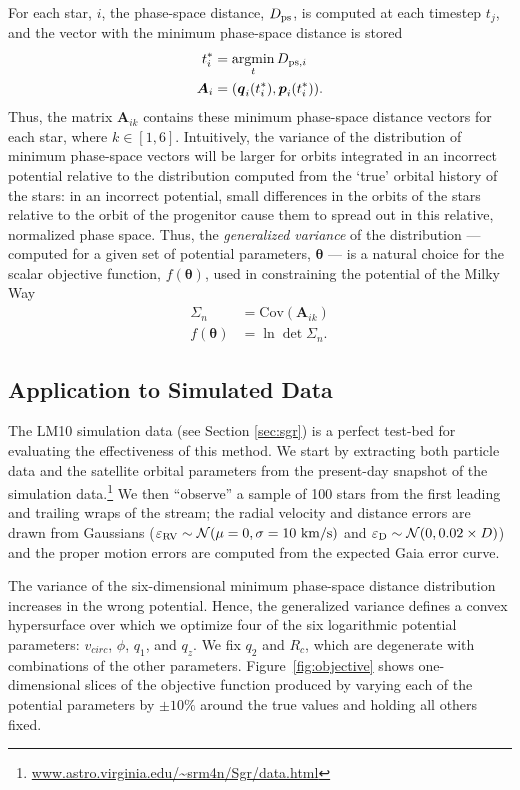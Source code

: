 \documentclass{emulateapj}
\newcommand{\bs}{\boldsymbol}
\newcommand{\argmin}{\operatornamewithlimits{argmin}}
\begin{document}
For each star, $i$,
the phase-space distance, $D_{\rm ps}$, is computed at each timestep
$t_{j}$, and the vector with the minimum phase-space distance is stored
\begin{align}
  t^*_{i} &= \argmin_{t} D_{{\rm ps},i}\\
  \bs{A}_{i} &= (\bs{q}_{i}(t^*_{i}),\bs{p}_{i}(t^*_{i})).
\end{align}
Thus, the matrix $\bs{A}_{ik}$ contains these minimum phase-space
distance vectors for each star, where $k\in[1,6]$. Intuitively, the
variance of the distribution of minimum phase-space vectors will be
larger for orbits integrated in an incorrect potential relative to the
distribution computed from the `true' orbital history of the stars: in
an incorrect potential, small differences in the orbits of the stars
relative to the orbit of the progenitor cause them to spread out in
this relative, normalized phase space. Thus, the \emph{generalized
  variance} of the distribution --- computed for a given set of
potential parameters, $\bs{\theta}$ --- is a natural choice for the
scalar objective function, $f(\bs{\theta})$, used in constraining the potential of the
Milky Way
\begin{align}
  \Sigma_n &= \mathrm{Cov}( \bs{A}_{ik}) \\
  f(\bs{\theta}) &= \ln \det \Sigma_n.
\end{align}

\subsection{Application to Simulated Data} \label{sec:results}
The LM10 simulation data (see Section \ref{sec:sgr}) is a perfect
test-bed for evaluating the effectiveness of this method. We start by
extracting both particle data and the satellite orbital parameters
from the present-day snapshot of the simulation
data.\footnote{\url{www.astro.virginia.edu/~srm4n/Sgr/data.html}} We
then ``observe'' a sample of 100 stars from the first leading and
trailing wraps of the stream; the radial velocity and distance errors are drawn 
from Gaussians ($\varepsilon_{\rm RV} \sim \mathcal{N}(\mu=0,\sigma=10~{\rm
  km/s})$ and $\varepsilon_{\rm D} \sim \mathcal{N}(0,0.02\times
D)$) and the proper motion errors are computed from the expected Gaia error curve. 

The variance of the six-dimensional minimum phase-space distance distribution increases in the wrong potential. Hence, the generalized variance defines a convex hypersurface over
which we optimize four of the six logarithmic potential parameters:
$v_{circ}$, $\phi$, $q_1$, and $q_z$. We fix $q_2$ and $R_c$, which
are degenerate with combinations of the other
parameters. Figure~\ref{fig:objective} shows one-dimensional slices of
the objective function produced by varying each of the potential
parameters by $\pm10\%$ around the true values and holding all others
fixed.
\end{document}

